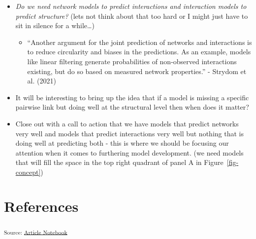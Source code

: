\documentclass[
  letterpaper,
  DIV=11,
  numbers=noendperiod]{scrartcl}
\providecommand{\tightlist}{%
  \setlength{\itemsep}{0pt}\setlength{\parskip}{0pt}}\usepackage{longtable,booktabs,array}
\begin{document}
\begin{itemize}
\item
  \emph{Do we need network models to predict interactions and
  interaction models to predict structure?} (lets not think about that
  too hard or I might just have to sit in silence for a while\ldots)

  \begin{itemize}
  \tightlist
  \item
    ``Another argument for the joint prediction of networks and
    interactions is to reduce circularity and biases in the predictions.
    As an example, models like linear filtering generate probabilities
    of non-observed interactions existing, but do so based on measured
    network properties.'' - Strydom et al. (2021)
  \end{itemize}
\item
  It will be interesting to bring up the idea that if a model is missing
  a specific pairwise link but doing well at the structural level then
  when does it matter?
\item
  Close out with a call to action that we have models that predict
  networks very well and models that predict interactions very well but
  nothing that is doing well at predicting both - this is where we
  should be focusing our attention when it comes to furthering model
  development. (we need models that will fill the space in the top right
  quadrant of panel A in Figure~\ref{fig-concept})
\end{itemize}

\section*{References}\label{references}

\textsubscript{Source:
\href{https://BecksLab.github.io/ms_t_is_for_topology/index.qmd.html}{Article
Notebook}}
\end{document}

